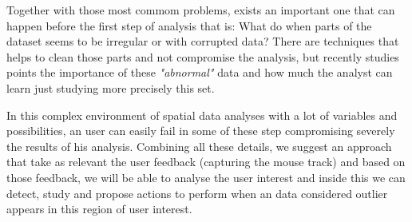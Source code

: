 Together with those most commom problems, exists an important one that can happen before
the first step of analysis that is: What do when parts of the dataset seems to be irregular
or with corrupted data? There are techniques that helps to clean those parts and not compromise
the analysis,
but recently studies points the importance of these \textit{"abnormal"} data and how much
the analyst can learn just studying more precisely this set. \cite{DBLP:journals/debu/FreireCVZ16}

In this complex environment of spatial data analyses with a lot of variables and possibilities,
an user can easily fail in some of these step compromising severely the results of his analysis.
Combining all these details, we suggest an approach that take as relevant the user feedback
(capturing the mouse track) and based on those feedback, we will be able to analyse the user
interest and inside this we can detect, study and propose actions to perform when an data considered
outlier appears in this region of user interest.




